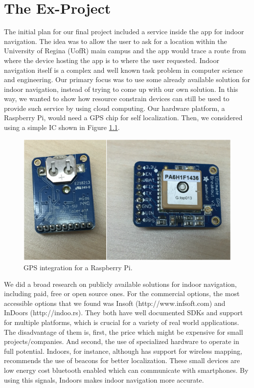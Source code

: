 \chapter{The Ex-Project}
\label{sec:ex-project}


The initial plan for our final project included a service inside the app for indoor navigation.
The idea was to allow the user to ask for a location within the University of Regina (UofR) main campus and the app would trace a route from where the device hosting the app is to where the user requested.
Indoor navigation itself is a complex and well known task problem in computer science and engineering.
Our primary focus was to use some already available solution for indoor navigation, instead of trying to come up with our own solution.
In this way, we wanted to show how resource constrain devices can still be used to provide such service by using cloud computing.
Our hardware platform, a Raspberry Pi, would need a GPS chip for self localization.
Then, we considered using a simple IC shown in Figure \ref{fig:console}.

\begin{figure}
\label{fig:console}
\centerline{
\includegraphics[width=\textwidth]{figures/chip_gps.png}
}
\caption{GPS integration for a Raspberry Pi.}
\end{figure}

We did a broad research on publicly available solutions for indoor navigation, including paid, free or open source ones.
For the commercial options, the most accessible options that we found was Insoft (http://www.infsoft.com) and InDoors (http://indoo.rs).
They both have well documented SDKs and support for multiple platforms, which is crucial for a variety of real world applications.
The disadvantage of them is, first, the price which might be expensive for small projects/companies. And second, the use of specialized hardware to operate in full potential.
Indoors, for instance, although has support for wireless mapping, recommends the use of beacons for better localization.
These small devices are low energy cost bluetooth enabled which can communicate with smartphones.
By using this signals, Indoors makes indoor navigation more accurate.

